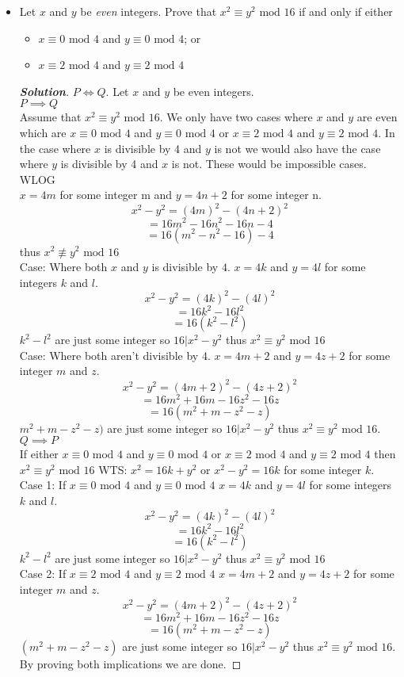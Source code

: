 \documentclass[11pt]{article}
\newenvironment{problem}[2][Problem\!]{\begin{trivlist}
\item[\hskip \labelsep {\bfseries #1}\hskip \labelsep {\bfseries #2.}]}{\end{trivlist}}
\newenvironment{solution}{\begin{proof}[\textbf{\textit{Solution}}]}{\end{proof}}
\newcommand{\modar}[1]{\text{ mod }{#1}} %
\begin{document}
\begin{problem}{4.2}
\begin{itemize}[itemsep=3em]
\item[(b)] Let $x$ and $y$ be \emph{even} integers. Prove that $x^2 \equiv y^2 \modar{16}$ if and only if either
\begin{itemize}
\item[(1)] $x \equiv 0 \modar{4}$ and $y \equiv 0 \modar{4}$; or
\item[(2)] $x \equiv 2 \modar{4}$ and $y \equiv 2 \modar{4}$
\end{itemize}
\begin{solution}
\(P \iff Q\).
Let \(x\) and \(y\) be even integers. \\
\(P \implies Q\) \\
Assume that \(x^2 \equiv y^2 \modar{16}\). We only have two cases where \(x\) and \(y\) are even which are $x \equiv 0 \modar{4}$ and $y \equiv 0 \modar{4}$ or $x \equiv 2 \modar{4}$ and $y \equiv 2 \modar{4}$. In the case where \(x\) is divisible by 4 and \(y\) is not we would also have the case where \(y\) is divisible by 4 and \(x\) is not. These would be impossible cases. WLOG\\
\(x = 4m\) for some integer m and \(y = 4n + 2\) for some integer n.
\[x^2 - y^2 = (4m)^2 - (4n+2)^2\]
\[= 16m^2-16n^2-16n-4\]
\[= 16(m^2-n^2-16)-4\] thus \(x^2 \not\equiv y^2 \modar{16}\)\\
Case: Where both \(x\) and \(y\) is divisible by \(4\).
\(x = 4k\) and \(y = 4l\) for some integers \(k\) and \(l\).
\[x^2-y^2 = (4k)^2 - (4l)^2\]
\[= 16k^2-16l^2\]
\[=16(k^2-l^2)\] \(k^2-l^2\) are just some integer so \(16| x^2 - y^2\) thus \(x^2 \equiv y^2 \modar{16}\)\\
Case: Where both aren't divisible by \(4\).
\(x = 4m + 2\) and \(y = 4z + 2\) for some integer \(m\) and \(z\).
\[x^2 - y^2 = (4m+2)^2-(4z+2)^2\]
\[= 16m^2+16m-16z^2-16z\]
\[= 16(m^2+m-z^2-z)\] \(m^2+m-z^2-z)\) are just some integer so \(16|x^2-y^2\) thus \(x^2 \equiv y^2 \modar{16}\).
\(Q \implies P\) \\
If either $x \equiv 0 \modar{4}$ and $y \equiv 0 \modar{4}$ or $x \equiv 2 \modar{4}$ and $y \equiv 2 \modar{4}$ then $x^2 \equiv y^2 \modar{16}$
WTS: \(x^2 = 16k + y^2\) or \(x^2-y^2 = 16k\) for some integer \(k.\)\\
Case 1: If \(x \equiv 0 \modar{4}\) and \(y \equiv 0 \modar{4}\)
\(x = 4k\) and \(y = 4l\) for some integers \(k\) and \(l\).
\[x^2-y^2 = (4k)^2 - (4l)^2\]
\[= 16k^2-16l^2\]
\[=16(k^2-l^2)\] \(k^2-l^2\) are just some integer so \(16| x^2 - y^2\) thus \(x^2 \equiv y^2 \modar{16}\)\\
Case 2: If \(x \equiv 2 \modar{4}\) and \(y \equiv 2 \modar{4}\)
\(x = 4m + 2\) and \(y = 4z + 2\) for some integer \(m\) and \(z\).
\[x^2 - y^2 = (4m+2)^2-(4z+2)^2\]
\[= 16m^2+16m-16z^2-16z\]
\[= 16(m^2+m-z^2-z)\] \((m^2+m-z^2-z)\) are just some integer so \(16|x^2-y^2\) thus \(x^2 \equiv y^2 \modar{16}\).
By proving both implications we are done.
\end{solution}


\end{itemize}
\end{problem}
\end{document}
